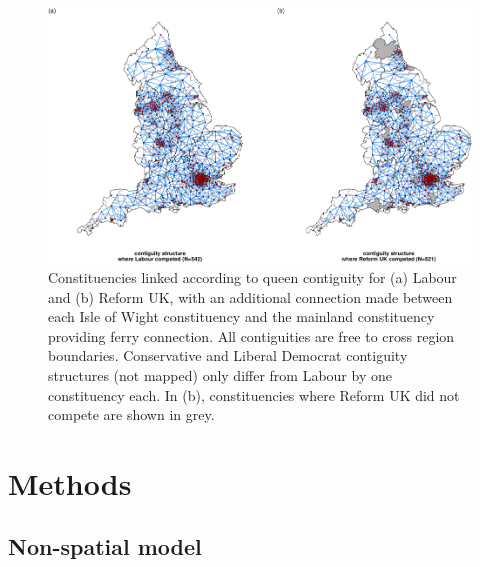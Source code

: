 \documentclass[webpdf,large,contemporary,namedate]{oup-authoring-template}
\theoremstyle{thmstyleone}
\theoremstyle{thmstyletwo}
\theoremstyle{thmstylethree}
\begin{document}
\begin{figure}[th]

{\centering \includegraphics[width=1\linewidth]{jrss_resubmission_files/figure-latex/figspatial-1} 

}

\caption{Constituencies linked according to queen contiguity for (a) Labour and (b) Reform UK, with an additional connection made between each Isle of Wight constituency and the mainland constituency providing ferry connection. All contiguities are free to cross region boundaries. Conservative and Liberal Democrat contiguity structures (not mapped) only differ from Labour by one constituency each. In (b), constituencies where Reform UK did not compete are shown in grey.}\label{fig:figspatial}
\end{figure}

\section{Methods}\label{methods}

\subsection{Non-spatial model}\label{non-spatial-model}
\end{document}

